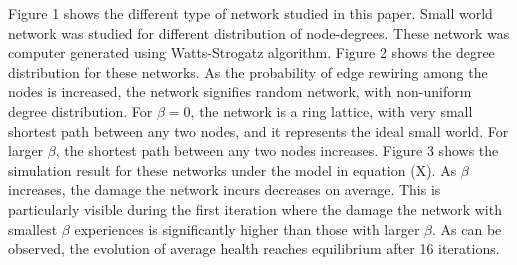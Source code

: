 \documentclass[11pt]{article}
\begin{document}
Figure 1 shows the different type of network studied in this paper. Small world network was studied for different distribution of node-degrees. These network was computer generated using Watts-Strogatz algorithm. Figure 2 shows the degree distribution for these networks. As the probability of edge rewiring among the nodes is increased, the network signifies random network, with non-uniform degree distribution. For $\beta=0$, the network is a ring lattice, with very small shortest path between any two nodes, and it represents the ideal small world. For larger $\beta$, the shortest path between any two nodes increases. Figure 3 shows the simulation result for these networks under the model in equation (X). As $\beta$ increases, the damage the network incurs decreases on average. This is particularly visible during the first iteration where the damage the network with smallest $\beta$ experiences is significantly higher than those with larger $\beta$. As can be observed, the evolution of average health reaches equilibrium after 16 iterations. 
\end{document}
